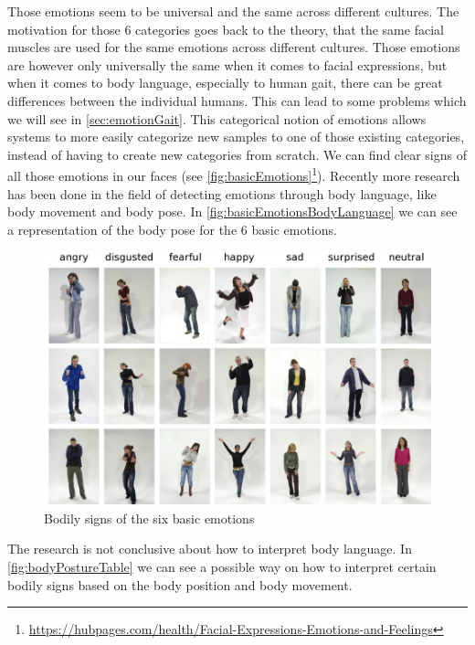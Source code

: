 \documentclass[conference]{IEEEtran}
\begin{document}
Those emotions seem to be universal and the same across different cultures\cite{ekmann1973universal}. The motivation for those 6 categories goes back to the theory, that the same facial muscles are used for the same emotions across different cultures\cite{schindler2008recognizing}. Those emotions are however only universally the same when it comes to facial expressions, but when it comes to body language, especially to human gait, there can be great differences between the individual humans. This can lead to some problems which we will see in \autoref{sec:emotionGait}.
This categorical notion of emotions allows systems to more easily categorize new samples to one of those existing categories, instead of having to create new categories from scratch\cite{schindler2008recognizing}.
We can find clear signs of all those emotions in our faces (see \autoref{fig:basicEmotions}\footnote{\url{https://hubpages.com/health/Facial-Expressions-Emotions-and-Feelings}}). Recently more research has been done in the field of detecting emotions through body language, like body movement and body pose\cite{de2006towards,grezes2007perceiving,meeren2005rapid}. In \autoref{fig:basicEmotionsBodyLanguage} we can see a representation of the body pose for the 6 basic emotions. 
\begin{figure}
\centering
   \includegraphics[width=\linewidth]{basicEmotionsBodylanguage.jpg}
  \caption{Bodily signs of the six basic emotions\cite{schindler2008recognizing}}
  \label{fig:basicEmotionsBodyLanguage}
\end{figure}

The research is not conclusive about how to interpret body language. In \autoref{fig:bodyPostureTable} we can see a possible way on how to interpret certain bodily signs based on the body position and body movement\cite{singhsignificance}.
 
\end{document}
